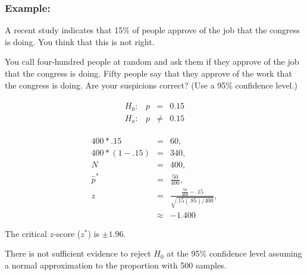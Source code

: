 \begin{frame}
  \frametitle{Example: }

  \vspace*{-2em}
  A recent study indicates that 15\% of people approve of the job that
  the congress is doing. You think that this is not right. 

  You call four-hundred people at random and ask them if they approve
  of the job that the congress is doing. Fifty people say that they
  approve of the work that the congress is doing. Are your suspicions
  correct?  (Use a 95\% confidence level.)

  \vfill

  {
    \begin{eqnarray*}
      \begin{array}{lrcl}
        H_0: & p & = & 0.15 \\
        H_a: & p & \neq & 0.15
      \end{array}
    \end{eqnarray*}
  }

  {
    \begin{eqnarray*}
      400*.15     & = & 60, \\
      400*(1-.15) & = & 340, \\
      N & = & 400, \\
      \hat{p}^* & = & \frac{50}{400}, \\
      z & = & \frac{\frac{50}{400}-.15}{\sqrt{.15(.85)/400}}, \\
      & \approx & -1.400
    \end{eqnarray*}
  }
  

  {
    The critical $z$-score ($z^*$) is $\pm 1.96$.
  }

  {

    {\color{red} 

      There is not sufficient evidence to reject $H_0$ at the 95\%
      confidence level assuming a normal approximation to the
      proportion with 500 samples.  

    }

  }

  \vfill
  
\end{frame}






